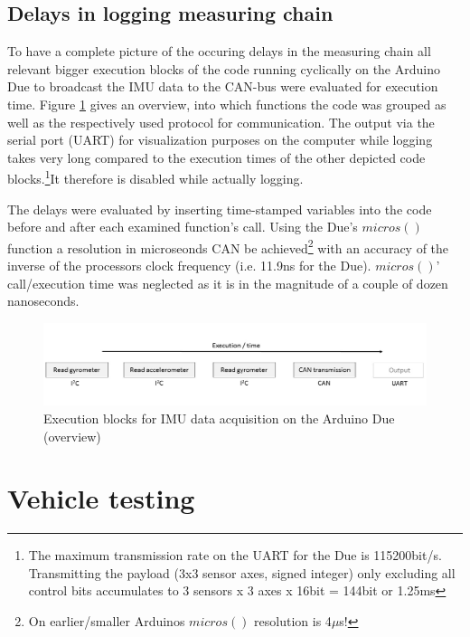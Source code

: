 \documentclass[ExampleMasters.tex]{subfiles}
\begin{document}
\subsection{Delays in logging measuring chain}
\label{sec:delays_on_arduino}

To have a complete picture of the occuring delays in the measuring chain all relevant bigger execution blocks of the code running cyclically on the Arduino Due to broadcast the \gls{IMU} data to the CAN-bus were evaluated for execution time. Figure \ref{fig:arduino_delays_sketch} gives an overview, into which functions the code was grouped as well as the respectively used protocol for communication. The output via the serial port (\gls{UART}) for visualization purposes on the computer while logging takes very long compared to the execution times of the other depicted code blocks.\footnote{The maximum transmission rate on the \gls{UART} for the Due is 115200bit/s. Transmitting the payload (3x3 sensor axes, signed integer) only excluding all control bits accumulates to 3 sensors x 3 axes x 16bit = 144bit  or 1.25ms}It therefore is disabled while actually logging. 

The delays were evaluated by inserting time-stamped variables into the code before and after each examined function's call. Using the Due's $micros()$ function a resolution in microseonds \gls{CAN} be achieved\footnote{On earlier/smaller Arduinos $micros()$ resolution is 4$\mu$s!} with an accuracy of the inverse of the processors clock frequency (i.e. 11.9ns for the Due). $micros()$' call/execution time was neglected as it is in the magnitude of a couple of dozen nanoseconds.

\begin{figure}[h!]
\centering
\includegraphics[width=1\linewidth]{figures/arduino_delays_sketch}
\caption{Execution blocks for \gls{IMU} data acquisition on the Arduino Due (overview)}
\label{fig:arduino_delays_sketch}
\end{figure}


\section{Vehicle testing}
\label{sec:vehicle-testing}
\end{document}
